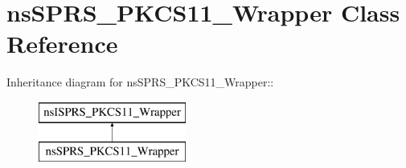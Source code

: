 \hypertarget{classnsSPRS__PKCS11__Wrapper}{
\section{nsSPRS\_\-PKCS11\_\-Wrapper Class Reference}
\label{classnsSPRS__PKCS11__Wrapper}
}
Inheritance diagram for nsSPRS\_\-PKCS11\_\-Wrapper::\begin{figure}[H]
\begin{center}
\leavevmode
\includegraphics[height=2cm]{classnsSPRS__PKCS11__Wrapper}
\end{center}
\end{figure}
